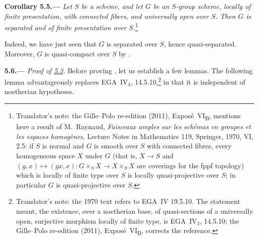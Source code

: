
\medskip
{}\label{cor:sga3-VIB-5.5}%
\noindent\textbf{Corollary 5.5.---}
\emph{Let \(S\) be a scheme, and let \(G\) be an \(S\)-group
scheme, locally of finite presentation, with connected fibers, and
universally open over \(S\). Then \(G\) is separated and of finite
presentation over \(S\).}\footnote{Translator's note: the Gille--Polo re-edition (2011),
Expos\'e~VI\textsubscript{B}, mentions here a result of M.~Raynaud, \emph{Faisceaux amples sur les sch\'emas en
groupes et les espaces homog\`enes}, Lecture Notes in Mathematics 119, Springer, 1970, VI, 2.5: if \(S\) is
normal and \(G\) is smooth over \(S\) with connected fibres, every homogeneous space \(X\) under \(G\) (that is,
\(X\to S\) and \((g,x)\mapsto(gx,x)\colon G\times_SX\to X\times_SX\) are coverings for the fppf topology) which
is locally of finite type over \(S\) is locally quasi-projective over \(S\); in particular \(G\) is
quasi-projective over \(S\).}

Indeed, we have just seen that \(G\) is separated over \(S\), hence
quasi-separated. Moreover, \(G\) is quasi-compact over \(S\) by
.

\medskip
{}\label{par:sga3-VIB-5.6}%
\noindent\textbf{5.6.---}
\emph{Proof of \hyperref[thm:sga3-VIB-5.3]{5.3}.}
Before proving , let us establish a few lemmas.
The following lemma advantageously replaces EGA~IV\(_3\), 14.5.10,\footnote{Translator's note: the 1970 text
refers to EGA~IV 19.5.10. The statement meant, the existence, over a noetherian base, of quasi-sections of a
universally open, surjective morphism locally of finite type, is EGA~IV\(_3\), 14.5.10; the Gille--Polo
re-edition (2011), Expos\'e~VI\textsubscript{B}, corrects the reference.} in that it is independent of
noetherian hypotheses.

